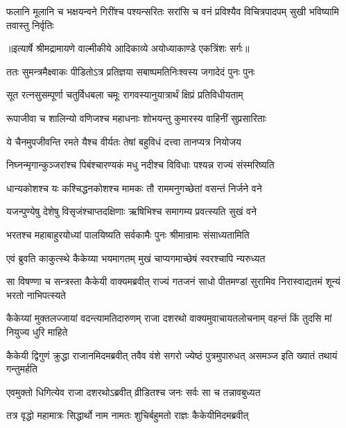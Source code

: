 \fourlineindentedshloka
{फलानि मूलानि च भक्षयन्वने}
{गिरींश्च पश्यन्सरितः सरांसि च}
{वनं प्रविश्यैव विचित्रपादपम्}
{सुखी भविष्यामि तवास्तु निर्वृतिः} %


{॥इत्यार्षे श्रीमद्रामायणे वाल्मीकीये आदिकाव्ये अयोध्याकाण्डे एकत्रिंशः सर्गः॥}


\twolineshloka
{ततः सुमन्त्रमैक्ष्वाकः पीडितोऽत्र प्रतिज्ञया}
{सबाष्पमतिनिःश्वस्य जगादेदं पुनः पुनः} %

\twolineshloka
{सूत रत्नसुसम्पूर्णा चतुर्विधबला चमूः}
{रागवस्यानुयात्रार्थं क्षिप्रं प्रतिविधीयताम्} %

\twolineshloka
{रूपाजीवा च शालिन्यो वणिजश्च महाधनाः}
{शोभयन्तु कुमारस्य वाहिनीं सुप्रसारिताः} %

\twolineshloka
{ये चैनमुपजीवन्ति रमते यैश्च वीर्यतः}
{तेषां बहुविधं दत्त्वा तानप्यत्र नियोजय} %

\twolineshloka
{निघ्नन्मृगान्कुञ्जरांश्च पिबंश्चारण्यकं मधु}
{नदीश्च विविधाः पश्यन्न राज्यं संस्मरिष्यति} %

\twolineshloka
{धान्यकोशश्च यः कश्चिद्धनकोशश्च मामकः}
{तौ राममनुगच्छेतां वसन्तं निर्जने वने} %

\twolineshloka
{यजन्पुण्येषु देशेषु विसृजंश्चाप्तदक्षिणाः}
{ऋषिभिश्च समागम्य प्रवत्स्यति सुखं वने} %

\twolineshloka
{भरतश्च महाबाहुरयोध्यां पालयिष्यति}
{सर्वकामैः पुनः श्रीमान्रामः संसाध्यतामिति} %

\twolineshloka
{एवं ब्रुवति काकुत्स्थे कैकेय्या भयमागतम्}
{मुखं चाप्यगमाच्छेषं स्वरश्चापि न्यरुध्यत} %

\threelineshloka
{सा विषण्णा च सन्त्रस्ता कैकेयी वाक्यमब्रवीत्}
{राज्यं गतजनं साधो पीतमण्डां सुरामिव}
{निरास्वाद्यतमं शून्यं भरतो नाभिपत्स्यते} %

\threelineshloka
{कैकेय्यां मुक्तलज्जायां वदन्त्यामतिदारुणम्}
{राजा दशरथो वाक्यमुवाचायतलोचनाम्}
{वहन्तं किं तुदसि मां नियुज्य धुरि माहिते} %

\threelineshloka
{कैकेयी द्विगुणं क्रुद्धा राजानमिदमब्रवीत्}
{तवैव वंशे सगरो ज्येष्ठं पुत्रमुपारुधत्}
{असमञ्ज इति ख्यातं तथायं गन्तुमर्हति} %

\twolineshloka
{एवमुक्तो धिगित्येव राजा दशरथोऽब्रवीत्}
{व्रीडितश्च जनः सर्वः सा च तन्नावबुध्यत} %

\twolineshloka
{तत्र वृद्धो महामात्रः सिद्धार्थो नाम नामतः}
{शुचिर्बहुमतो राज्ञः कैकेयीमिदमब्रवीत्} %

